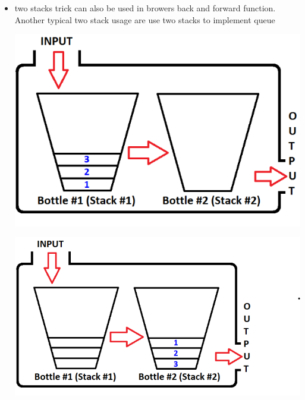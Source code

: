 \documentclass[a4paper,11pt,twoside]{book}
\begin{document}
\begin{itemize}
	\item two stacks trick can also be used in browers back and forward function. Another typical two stack usage are use two stacks to implement queue
	
	\begin{center}
		\includegraphics[scale=0.3]{pics/sq1.png} 
	\end{center}
	\begin{center}
		\includegraphics[scale=0.3]{pics/sq2.png} 
	\end{center}
	
\end{itemize}
\end{document}

